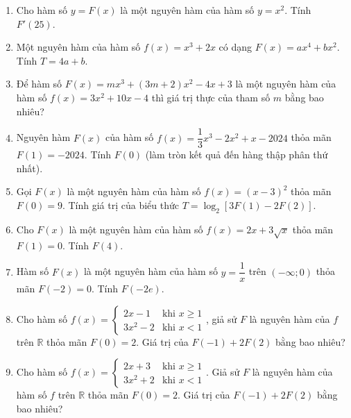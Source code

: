 \documentclass[12pt]{article}
\begin{document}
	\begin{enumerate}[label=\textbf{Câu \arabic*.}, start=1]
		
		\item Cho hàm số $y = F(x)$ là một nguyên hàm của hàm số $y = x^2$. Tính $F'(25)$.
		 
		
		\item Một nguyên hàm của hàm số $f(x) = x^3 + 2x$ có dạng $F(x) = ax^4 + bx^2$. Tính $T = 4a + b$.
		 
		
		\item Để hàm số $F(x) = mx^3 + (3m+2)x^2 - 4x + 3$ là một nguyên hàm của hàm số $f(x) = 3x^2 + 10x - 4$ thì giá trị thực của tham số $m$ bằng bao nhiêu?
		 
		
		\item Nguyên hàm $F(x)$ của hàm số $f(x) = \dfrac{1}{3}x^3 - 2x^2 + x - 2024$ thỏa mãn $F(1) = -2024$. Tính $F(0)$ (làm tròn kết quả đến hàng thập phân thứ nhất).
		 
		
		\item Gọi $F(x)$ là một nguyên hàm của hàm số $f(x) = (x - 3)^2$ thỏa mãn $F(0) = 9$. Tính giá trị của biểu thức $T = \log_2 \left[ 3F(1) - 2F(2) \right]$.
		 
		
		\item Cho $F(x)$ là một nguyên hàm của hàm số $f(x) = 2x + 3\sqrt{x}$ thỏa mãn $F(1) = 0$. Tính $F(4)$.
		 
		
		\item Hàm số $F(x)$ là một nguyên hàm của hàm số $y = \dfrac{1}{x}$ trên $(-\infty; 0)$ thỏa mãn $F(-2) = 0$. Tính $F(-2e)$.
		 
		
		\item Cho hàm số $f(x) = \begin{cases} 2x - 1 & \text{khi } x \ge 1 \\ 3x^2 - 2 & \text{khi } x < 1 \end{cases}$, giả sử $F$ là nguyên hàm của $f$ trên $\mathbb{R}$ thỏa mãn $F(0) = 2$. Giá trị của $F(-1) + 2F(2)$ bằng bao nhiêu?
		 
		
		\item Cho hàm số $f(x) = \begin{cases} 2x + 3 & \text{khi } x \ge 1 \\ 3x^2 + 2 & \text{khi } x < 1 \end{cases}$. Giả sử $F$ là nguyên hàm của hàm số $f$ trên $\mathbb{R}$ thỏa mãn $F(0) = 2$. Giá trị của $F(-1) + 2F(2)$ bằng bao nhiêu?
		 

\end{enumerate}
\end{document}
